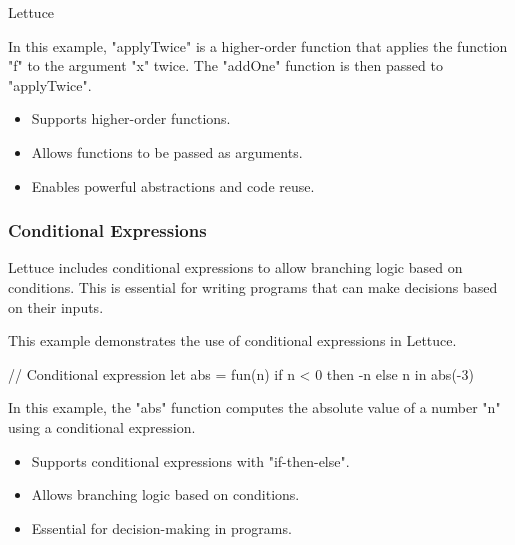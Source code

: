 \begin{notes}{Lettuce}
\begin{highlight}
        In this example, "applyTwice" is a higher-order function that applies the function "f" to the argument "x" twice. The "addOne" function is then passed to "applyTwice".
    
    \begin{itemize}
        \item Supports higher-order functions.
        \item Allows functions to be passed as arguments.
        \item Enables powerful abstractions and code reuse.
    \end{itemize}
    
    \end{highlight}
    
    \subsubsection*{Conditional Expressions}
    
    Lettuce includes conditional expressions to allow branching logic based on conditions. This is essential for writing programs that can make decisions based on their inputs.
    
    \begin{highlight}
    
        This example demonstrates the use of conditional expressions in Lettuce.
    
    \begin{code}[Lettuce]
    // Conditional expression
    let abs = fun(n) {
        if n < 0 then -n else n
    } in
    abs(-3)
    \end{code}
    
        In this example, the "abs" function computes the absolute value of a number "n" using a conditional expression.
    
        \begin{itemize}
            \item Supports conditional expressions with "if-then-else".
            \item Allows branching logic based on conditions.
            \item Essential for decision-making in programs.
        \end{itemize}
    
    \end{highlight}
    
    \begin{highlight}
    

\end{highlight}
\end{notes}
